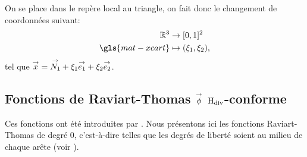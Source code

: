  On se place dans le repère local au triangle, on fait donc le changement de coordonnées suivant:
  \begin{align*}
    \RR^3 &\rightarrow [0,1]^2 \\
   \gls{mat-xcart} & \mapsto (\xi_1,\xi_2),
  \end{align*}
    tel que \({\overset{\rightarrow}{x}} ={\overset{\rightarrow}{N_1}}+ \xi_1 {\overset{\rightarrow}{e_1}} + \xi_2 {\overset{\rightarrow}{e_2}}\).

  \subsection[Fonctions de Raviart-Thomas phi Hdiv-conforme]{Fonctions de Raviart-Thomas \({\overset{\rightarrow}{\phi}}\) \(\mathrm{H}_\mathrm{div}\)-conforme}

    Ces fonctions ont été introduites par \cite{raviart_mixed_1977}.
    Nous présentons ici les fonctions Raviart-Thomas de degré 0, c'est-à-dire telles que les degrés de liberté soient au milieu de chaque arête (voir \cite[eq.~(3.10)]{raviart_mixed_1977}).

